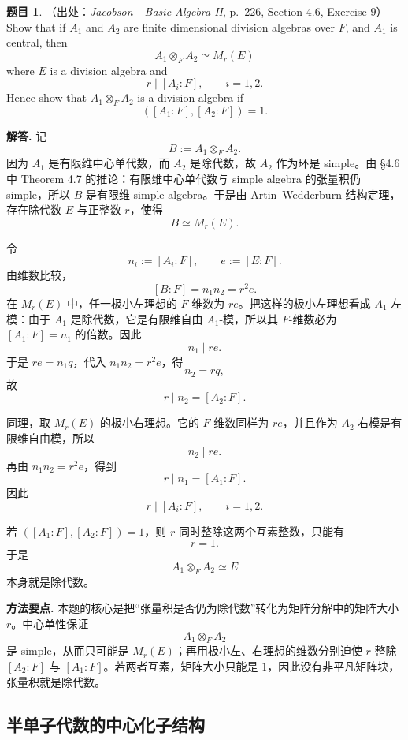 \documentclass[a4paper]{ctexart}
\theoremstyle{definition}
\newtheorem{example}{题目}[section]
\theoremstyle{analysis}
\theoremstyle{plain}
\begin{document}
\begin{example}
（出处：\textit{Jacobson - Basic Algebra II}, p.~226, Section 4.6, Exercise 9）
Show that if \(A_1\) and \(A_2\) are finite dimensional division algebras over
\(F\), and \(A_1\) is central, then
\[
  A_1\otimes_F A_2\simeq M_r(E)
\]
where \(E\) is a division algebra and
\[
  r\mid [A_i:F],\qquad i=1,2.
\]
Hence show that \(A_1\otimes_F A_2\) is a division algebra if
\[
  ([A_1:F],[A_2:F])=1.
\]

\textbf{解答.}
记
\[
  B:=A_1\otimes_F A_2.
\]
因为 \(A_1\) 是有限维中心单代数，而 \(A_2\) 是除代数，故 \(A_2\) 作为环是 simple。由 §4.6 中 Theorem 4.7 的推论：有限维中心单代数与 simple algebra 的张量积仍 simple，所以 \(B\) 是有限维 simple algebra。于是由 Artin--Wedderburn 结构定理，存在除代数 \(E\) 与正整数 \(r\)，使得
\[
  B\simeq M_r(E).
\]

令
\[
  n_i:=[A_i:F],\qquad e:=[E:F].
\]
由维数比较，
\[
  [B:F]=n_1n_2=r^2e.
\]
在 \(M_r(E)\) 中，任一极小左理想的 \(F\)-维数为 \(re\)。把这样的极小左理想看成 \(A_1\)-左模：由于 \(A_1\) 是除代数，它是有限维自由 \(A_1\)-模，所以其 \(F\)-维数必为 \([A_1:F]=n_1\) 的倍数。因此
\[
  n_1\mid re.
\]
于是 \(re=n_1q\)，代入 \(n_1n_2=r^2e\)，得
\[
  n_2=rq,
\]
故
\[
  r\mid n_2=[A_2:F].
\]

同理，取 \(M_r(E)\) 的极小右理想。它的 \(F\)-维数同样为 \(re\)，并且作为 \(A_2\)-右模是有限维自由模，所以
\[
  n_2\mid re.
\]
再由 \(n_1n_2=r^2e\)，得到
\[
  r\mid n_1=[A_1:F].
\]
因此
\[
  r\mid [A_i:F],\qquad i=1,2.
\]

若 \(([A_1:F],[A_2:F])=1\)，则 \(r\) 同时整除这两个互素整数，只能有
\[
  r=1.
\]
于是
\[
  A_1\otimes_F A_2\simeq E
\]
本身就是除代数。

\textbf{方法要点.}
本题的核心是把“张量积是否仍为除代数”转化为矩阵分解中的矩阵大小 \(r\)。中心单性保证
\[
  A_1\otimes_F A_2
\]
是 simple，从而只可能是 \(M_r(E)\)；再用极小左、右理想的维数分别迫使 \(r\) 整除 \([A_2:F]\) 与 \([A_1:F]\)。若两者互素，矩阵大小只能是 \(1\)，因此没有非平凡矩阵块，张量积就是除代数。
\end{example}

\subsection{半单子代数的中心化子结构}\label{subsec:problem-semisimple-subalgebra-centralizer}
\end{document}

